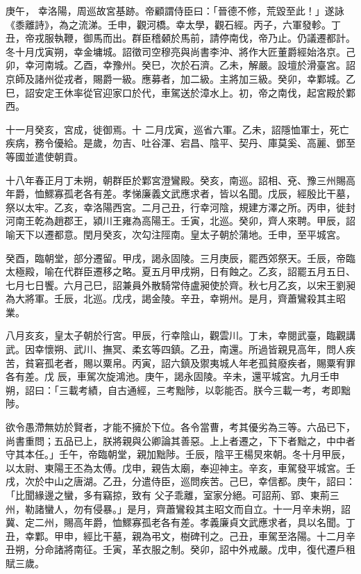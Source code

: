 \begin{pinyinscope}
 庚午，
 幸洛陽，周巡故宮基跡。帝顧謂侍臣曰：「晉德不修，荒毀至此！」遂詠《黍離詩》，為之流涕。壬申，觀河橋。幸太學，觀石經。丙子，六軍發軫。丁丑，帝戎服執鞭，御馬而出。群臣稽顙於馬前，請停南伐，帝乃止。仍議遷都計。冬十月戊寅朔，幸金墉城。詔徵司空穆亮與尚書李沖、將作大匠董爵經始洛京。己卯，幸河南城。乙酉，幸豫州。癸巳，次於石濟。乙未，解嚴。設壇於滑臺宮。詔京師及諸州從戎者，賜爵一級。應募者，加二級。主將加三級。癸卯，幸鄴城。乙巳，詔安定王休率從官迎家口於代，車駕送於漳水上。初，帝之南伐，起宮殿於鄴西。



 十一月癸亥，宮成，徙御焉。十
 二月戊寅，巡省六軍。乙未，詔隱恤軍士，死亡疾病，務令優給。是歲，勿吉、吐谷渾、宕昌、陰平、契丹、庫莫奚、高麗、鄧至等國並遣使朝貢。



 十八年春正月丁未朔，朝群臣於鄴宮澄鸞殿。癸亥，南巡。詔相、兗、豫三州賜高年爵，恤鰥寡孤老各有差。孝悌廉義文武應求者，皆以名聞。戊辰，經殷比干墓，祭以太牢。乙亥，幸洛陽西宮。二月己丑，行幸河陰，規建方澤之所。丙申，徙封河南王乾為趙郡王，潁川王雍為高陽王。壬寅，北巡。癸卯，齊人來聘。甲辰，詔喻天下以遷都意。閏月癸亥，次勾注陘南。皇太子朝於蒲地。壬申，至平城宮。



 癸酉，臨朝堂，部分遷留。甲戌，謁永固陵。三月庚辰，罷西郊祭天。壬辰，帝臨太極殿，喻在代群臣遷移之略。夏五月甲戌朔，日有蝕之。乙亥，詔罷五月五日、七月七日饗。六月己巳，詔兼員外散騎常侍盧昶使於齊。秋七月乙亥，以宋王劉昶為大將軍。壬辰，北巡。戊戌，謁金陵。辛丑，幸朔州。是月，齊蕭鸞殺其主昭業。



 八月亥亥，皇太子朝於行宮。甲辰，行幸陰山，觀雲川。丁未，幸閱武臺，臨觀講武。因幸懷朔、武川、撫冥、柔玄等四鎮。乙丑，南還。所過皆親見高年，問人疾苦，貧窘孤老者，賜以粟帛。丙寅，詔六鎮及禦夷城人年老孤貧廢疾者，賜粟宥罪各有差。戊
 辰，車駕次旋鴻池。庚午，謁永固陵。辛未，還平城宮。九月壬申朔，詔曰：「三載考績，自古通經，三考黜陟，以彰能否。朕今三載一考，考即黜陟。



 欲令愚滯無妨於賢者，才能不擁於下位。各令當曹，考其優劣為三等。六品已下，尚書重問；五品已上，朕將親與公卿論其善惡。上上者遷之，下下者黜之，中中者守其本任。」壬午，帝臨朝堂，親加黜陟。壬辰，陰平王楊炅來朝。冬十月甲辰，以太尉、東陽王丕為太傅。戊申，親告太廟，奉迎神主。辛亥，車駕發平城宮。壬戌，次於中山之唐湖。乙丑，分遣侍臣，巡問疾苦。己巳，幸信都。庚午，詔曰：「比聞緣邊之蠻，多有竊掠，致有
 父子乖離，室家分絕。可詔荊、郢、東荊三州，勒諸蠻人，勿有侵暴。」是月，齊蕭鸞殺其主昭文而自立。十一月辛未朔，詔冀、定二州，賜高年爵，恤鰥寡孤老各有差。孝義廉貞文武應求者，具以名聞。丁丑，幸鄴。甲申，經比干墓，親為弔文，樹碑刊之。己丑，車駕至洛陽。十二月辛丑朔，分命諸將南征。壬寅，革衣服之制。癸卯，詔中外戒嚴。戊申，復代遷戶租賦三歲。




\end{pinyinscope}
